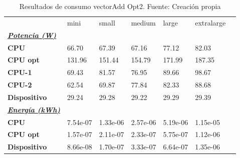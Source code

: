 \begin{table}[H]
    \centering
    \begin{tabular}{lllllll}
    \rowcolor[HTML]{DAE8FC} \ & mini & small & medium & 	large & 	extralarge \\
    \cellcolor[HTML]{DAE8FC} \textbf{\textbf{{\emph{{\underline{{Potencia (W)}}}}}}} &  &  &  & 	 & 	 \\
    \rowcolor[HTML]{EFEFEF} \cellcolor[HTML]{DAE8FC} \textbf{CPU} & 66.70 & 67.39 & 67.16 & 	77.12 & 	82.03 \\
    \cellcolor[HTML]{DAE8FC} \textbf{CPU opt} & 131.96 & 151.44 & 154.79 & 	171.99 & 	187.35 \\
    \rowcolor[HTML]{EFEFEF} \cellcolor[HTML]{DAE8FC} \textbf{\quad CPU-1} & 69.43 & 81.57 & 76.95 & 	89.66 & 	98.67 \\
    \cellcolor[HTML]{DAE8FC} \textbf{\quad CPU-2} & 62.54 & 69.87 & 77.84 & 	82.33 & 	88.68 \\
    \rowcolor[HTML]{EFEFEF} \cellcolor[HTML]{DAE8FC} \textbf{Dispositivo} & 29.24 & 29.28 & 29.22 & 	29.29 & 	29.39 \\
    \cellcolor[HTML]{DAE8FC} \textbf{\textbf{{\emph{{\underline{{Energía (kWh)}}}}}}} &  &  &  & 	 & 	 \\
    \rowcolor[HTML]{EFEFEF} \cellcolor[HTML]{DAE8FC} \textbf{CPU} & 7.54e-07 & 1.33e-06 & 2.57e-06 & 	5.19e-06 & 	1.15e-05 \\
    \cellcolor[HTML]{DAE8FC} \textbf{CPU opt} & 1.57e-07 & 2.11e-07 & 2.33e-07 & 	5.75e-07 & 	1.12e-06 \\
    \rowcolor[HTML]{EFEFEF} \cellcolor[HTML]{DAE8FC} \textbf{Dispositivo} & 8.66e-08 & 1.70e-07 & 3.33e-07 & 	6.64e-07 & 	1.35e-06 \\
    \end{tabular}
    \caption[Resultados de consumo vectorAdd Opt2]{{Resultados de consumo vectorAdd Opt2. Fuente: Creación propia}}
    \label{table_test_vectorAdd_Opt2_hw_powerResults}
\end{table}